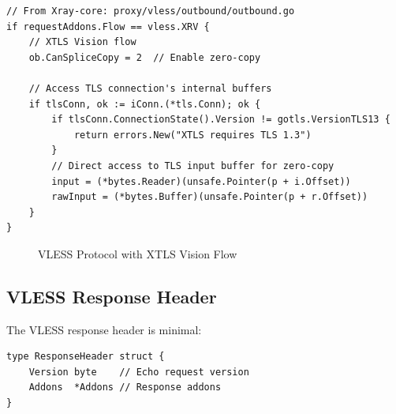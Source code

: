 \begin{verbatim}
// From Xray-core: proxy/vless/outbound/outbound.go
if requestAddons.Flow == vless.XRV {
    // XTLS Vision flow
    ob.CanSpliceCopy = 2  // Enable zero-copy
    
    // Access TLS connection's internal buffers
    if tlsConn, ok := iConn.(*tls.Conn); ok {
        if tlsConn.ConnectionState().Version != gotls.VersionTLS13 {
            return errors.New("XTLS requires TLS 1.3")
        }
        // Direct access to TLS input buffer for zero-copy
        input = (*bytes.Reader)(unsafe.Pointer(p + i.Offset))
        rawInput = (*bytes.Buffer)(unsafe.Pointer(p + r.Offset))
    }
}
\end{verbatim}

\begin{figure}[h]
    \centering
    \caption{VLESS Protocol with XTLS Vision Flow}
\end{figure}

\subsection{VLESS Response Header}

The VLESS response header is minimal:

\begin{verbatim}
type ResponseHeader struct {
    Version byte    // Echo request version
    Addons  *Addons // Response addons
}
\end{verbatim}

